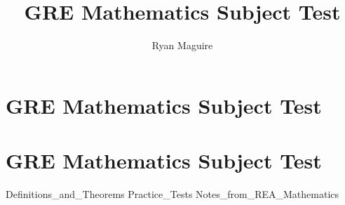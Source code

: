 \documentclass[crop=false,class=book,oneside]{standalone}
\begin{document}
    \newif\ifcoursesmathgre
    \ifx\ifmathcourses\undefined
        \title{GRE Mathematics Subject Test}
        \author{Ryan Maguire}
        \date{\vspace{-5ex}}
        \maketitle
        \tableofcontents
        \clearpage
        \chapter*{GRE Mathematics Subject Test}
        \setcounter{chapter}{1}
    \else
        \chapter{GRE Mathematics Subject Test}
    \fi
    {Definitions_and_Theorems}
    {Practice_Tests}
    {Notes_from_REA_Mathematics}
\end{document}
